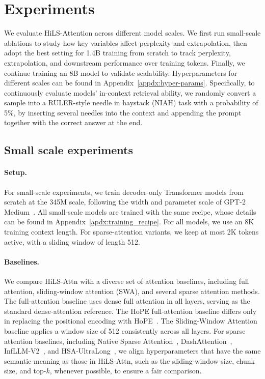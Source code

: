 \section{Experiments}
We evaluate HiLS-Attention across different model scales. We first run small-scale ablations to study how key variables affect perplexity and extrapolation, then adopt the best setting for 1.4B training from scratch to track perplexity, extrapolation, and downstream performance over training tokens. Finally, we continue training an 8B model to validate scalability. Hyperparameters for different scales can be found in Appendix~\ref{appdx:hyper-params}. %
Specifically, to continuously evaluate models' in-context retrieval ability, we randomly convert a sample into a RULER-style needle in haystack (NIAH) task with a probability of 5\%, by inserting several needles into the context and appending the prompt together with the correct answer at the end.

\subsection{Small scale experiments}\label{sec:small_scale_exp}
\paragraph{Setup.} %

For small-scale experiments, we train decoder-only Transformer models from scratch at the 345M scale, following the width and parameter scale of GPT-2 Medium~\citep{radford2019language}. All small-scale models are trained with the same recipe, whose details can be found in Appendix~\ref{apdx:training_recipe}. 
For all models, we use an 8K training context length. For sparse-attention variants, we keep at most 2K tokens active, with a sliding window of length 512.

\paragraph{Baselines.} We compare HiLS-Attn with a diverse set of attention baselines, including full attention, sliding-window attention (SWA), and several sparse attention methods. 
The full-attention baseline uses dense full attention in all layers, serving as the standard dense-attention reference. The HoPE full-attention baseline differs only in replacing the positional encoding with HoPE~\citep{chen-etal-2025-hope}. The Sliding-Window Attention baseline applies a window size of 512 consistently across all layers. For sparse attention baselines, including Native Sparse Attention~\citep{yuan-etal-2025-native}, DashAttention~\citep{huang2026dashattentiondifferentiableadaptivesparse}, InfLLM-V2~\citep{zhao2025infllmv2densesparseswitchableattention}, and HSA-UltraLong~\citep{hu2026everytoken}, we align hyperparameters that have the same semantic meaning as those in HiLS-Attn, such as the sliding-window size, chunk size, and top-\(k\), whenever possible, to ensure a fair comparison.

